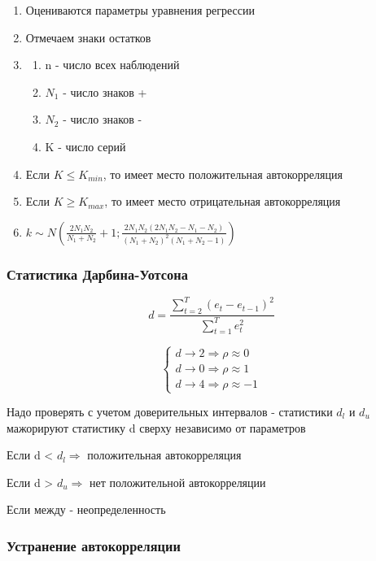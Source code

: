 \documentclass[a4paper, 12pt]{article}
\begin{document}
\begin{enumerate}
    \item Оцениваются параметры уравнения регрессии
    \item Отмечаем знаки остатков
    \item \begin{enumerate}
        \item n - число всех наблюдений
        \item $N_{1}$ - число знаков +
        \item $N_{2}$ - число знаков - 
        \item K - число серий
    \end{enumerate}
    \item Если $K \leq K_{min}$, то имеет место положительная автокорреляция
    \item Если $K \geq K_{max}$, то имеет место отрицательная автокорреляция
    \item $k \sim N(\frac{2N_{1}N_{2}}{N_{1} + N_{2}} + 1; \frac{2N_{1}N_{2}(2N_{1}N_{2} - N_{1} - N_{2})}{(N_{1} + N_{2})^{2}(N_{1} + N_{2} - 1)})$
\end{enumerate}

\subsubsection{Статистика Дарбина-Уотсона}

\[d = \frac{\sum_{t = 2}^{T}(e_{t} - e_{t - 1})^{2}}{\sum_{t = 1}^{T}e_{t}^{2}}\]

\[\begin{cases}
    d \rightarrow 2 \Rightarrow \rho \approx 0 \\
    d \rightarrow 0 \Rightarrow \rho \approx 1 \\
    d \rightarrow 4 \Rightarrow \rho \approx -1 
\end{cases}\]

Надо проверять с учетом доверительных интервалов - статистики $d_{l}$ и $d_{u}$ мажорируют статистику d сверху независимо от параметров

Если d < $d_{l} \Rightarrow$ положительная автокорреляция

Если d > $d_{u} \Rightarrow$ нет положительной автокорреляции

Если между - неопределенность

\subsubsection{Устранение автокорреляции}
\end{document}
